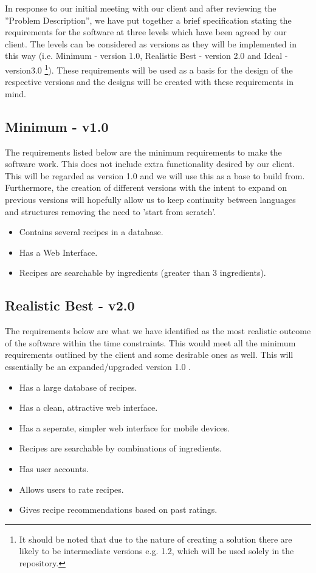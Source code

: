 In response to our initial meeting with our client and after reviewing the ''Problem Description'', we have put together a brief specification stating the requirements for the software at three levels which have been agreed by our client. The levels can be considered as versions as they will be implemented in this way (i.e. Minimum - version 1.0, Realistic Best -  version 2.0 and Ideal - version3.0 \footnote{It should be noted that due to the nature of creating a solution there are likely to be intermediate versions e.g. 1.2, which will be used solely in the repository.}). These requirements will be used as a basis for the design of the respective versions and the designs will be created with these requirements in mind.

\subsection{Minimum - v1.0}

The requirements listed below are the minimum requirements to make the software work. This does not include extra functionality desired by our client. This will be regarded as version 1.0 and we will use this as a base to build from. 
Furthermore, the creation of different versions with the intent to expand on previous versions will hopefully allow us to keep 
continuity between languages and structures removing the need to 'start from scratch'.

\begin{itemize}
	\item Contains several recipes in a database.
	\item Has a Web Interface.
	\item Recipes are searchable by ingredients (greater than 3 ingredients).

\end{itemize}

\subsection{Realistic Best - v2.0}

The requirements below are what we have identified as the most realistic outcome of the software within the time constraints. This would meet all the minimum requirements outlined by the client and some desirable ones as well. This will
essentially be an expanded/upgraded version 1.0 .

\begin{itemize}
	\item Has a large database of recipes.
	\item Has a clean, attractive web interface.
	\item Has a seperate, simpler web interface for mobile devices.
	\item Recipes are searchable by combinations of ingredients.
	\item Has user accounts.
	\item Allows users to rate recipes.
	\item Gives recipe recommendations based on past ratings.
\end{itemize}

